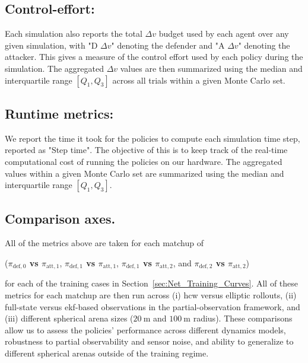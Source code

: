 
\subsection*{Control-effort:}

Each simulation also reports the total \(\Delta v\) budget used by each agent over any given simulation, with "D \(\Delta v\)" denoting the defender and "A \(\Delta v\)" denoting the attacker. This gives a measure of the control effort used by each policy during the simulation. The aggregated \(\Delta v\) values are then summarized using the median and interquartile range \([Q_1,Q_3]\)
across all trials within a given Monte Carlo set.

\subsection*{Runtime metrics:}

We report the time it took for the policies to compute each simulation time step, reported as "Step time". The objective of this is to keep track of the real-time computational cost of running the policies on our hardware. The aggregated values within a given Monte Carlo set are summarized using the median and interquartile range \([Q_1,Q_3]\).


\subsection*{Comparison axes.}
All of the metrics above are taken for each matchup of 

({\boldmath\textbf{$\pi_{\mathrm{def},0}$ vs $\pi_{\mathrm{att},1}$}}, {\boldmath\textbf{$\pi_{\mathrm{def},1}$ vs $\pi_{\mathrm{att},1}$}}, {\boldmath\textbf{$\pi_{\mathrm{def},1}$ vs $\pi_{\mathrm{att},2}$}}, and {\boldmath\textbf{$\pi_{\mathrm{def},2}$ vs $\pi_{\mathrm{att},2}$}}) 


for each of the training cases in Section~\ref{sec:Net_Training_Curves}. All of these metrics for each matchup are then run across (i) \acs{hcw} versus elliptic rollouts, (ii) full-state versus \acs{ekf}-based observations in the partial-observation framework, and (iii) different spherical arena sizes ($20~\mathrm{m}$ and $100~\mathrm{m}$ radius). These comparisons allow us to assess the policies' performance across different dynamics models, robustness to partial observability and sensor noise, and ability to generalize to different spherical arenas outside of the training regime.

